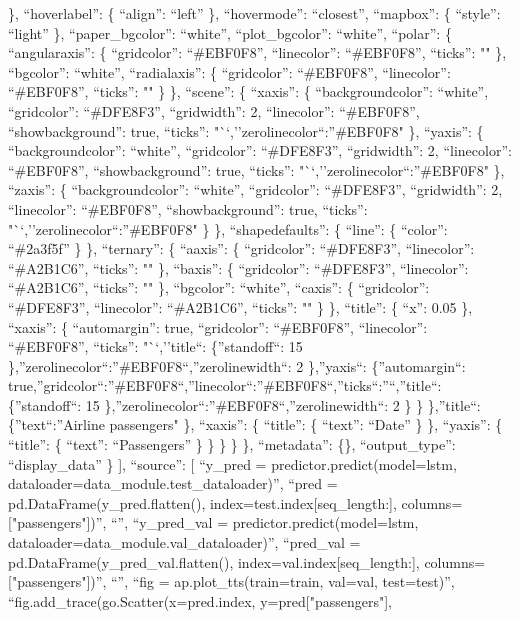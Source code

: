 \documentclass[
]{article}
\begin{document}
\}, ``hoverlabel'': \{ ``align'': ``left'' \}, ``hovermode'':
``closest'', ``mapbox'': \{ ``style'': ``light'' \}, ``paper\_bgcolor'':
``white'', ``plot\_bgcolor'': ``white'', ``polar'': \{ ``angularaxis'':
\{ ``gridcolor'': ``\#EBF0F8'', ``linecolor'': ``\#EBF0F8'', ``ticks'':
"" \}, ``bgcolor'': ``white'', ``radialaxis'': \{ ``gridcolor'':
``\#EBF0F8'', ``linecolor'': ``\#EBF0F8'', ``ticks'': "" \} \},
``scene'': \{ ``xaxis'': \{ ``backgroundcolor'': ``white'',
``gridcolor'': ``\#DFE8F3'', ``gridwidth'': 2, ``linecolor'':
``\#EBF0F8'', ``showbackground'': true, ``ticks'':
"``,''zerolinecolor``:''\#EBF0F8" \}, ``yaxis'': \{ ``backgroundcolor'':
``white'', ``gridcolor'': ``\#DFE8F3'', ``gridwidth'': 2, ``linecolor'':
``\#EBF0F8'', ``showbackground'': true, ``ticks'':
"``,''zerolinecolor``:''\#EBF0F8" \}, ``zaxis'': \{ ``backgroundcolor'':
``white'', ``gridcolor'': ``\#DFE8F3'', ``gridwidth'': 2, ``linecolor'':
``\#EBF0F8'', ``showbackground'': true, ``ticks'':
"``,''zerolinecolor``:''\#EBF0F8" \} \}, ``shapedefaults'': \{ ``line'':
\{ ``color'': ``\#2a3f5f'' \} \}, ``ternary'': \{ ``aaxis'': \{
``gridcolor'': ``\#DFE8F3'', ``linecolor'': ``\#A2B1C6'', ``ticks'': ""
\}, ``baxis'': \{ ``gridcolor'': ``\#DFE8F3'', ``linecolor'':
``\#A2B1C6'', ``ticks'': "" \}, ``bgcolor'': ``white'', ``caxis'': \{
``gridcolor'': ``\#DFE8F3'', ``linecolor'': ``\#A2B1C6'', ``ticks'': ""
\} \}, ``title'': \{ ``x'': 0.05 \}, ``xaxis'': \{ ``automargin'': true,
``gridcolor'': ``\#EBF0F8'', ``linecolor'': ``\#EBF0F8'', ``ticks'':
"``,''title``: \{''standoff``: 15
\},''zerolinecolor``:''\#EBF0F8``,''zerolinewidth``: 2 \},''yaxis``:
\{''automargin``:
true,''gridcolor``:''\#EBF0F8``,''linecolor``:''\#EBF0F8``,''ticks``:''``,''title``:
\{''standoff``: 15 \},''zerolinecolor``:''\#EBF0F8``,''zerolinewidth``:
2 \} \} \},''title``: \{''text``:''Airline passengers" \}, ``xaxis'': \{
``title'': \{ ``text'': ``Date'' \} \}, ``yaxis'': \{ ``title'': \{
``text'': ``Passengers'' \} \} \} \} \}, ``metadata'': \{\},
``output\_type'': ``display\_data'' \} {]}, ``source'': {[} ``y\_pred =
predictor.predict(model=lstm,
dataloader=data\_module.test\_dataloader)\n'', ``pred =
pd.DataFrame(y\_pred.flatten(), index=test.index{[}seq\_length:{]},
columns={[}"passengers"{]})\n'', ``\n'', ``y\_pred\_val =
predictor.predict(model=lstm,
dataloader=data\_module.val\_dataloader)\n'', ``pred\_val =
pd.DataFrame(y\_pred\_val.flatten(), index=val.index{[}seq\_length:{]},
columns={[}"passengers"{]})\n'', ``\n'', ``fig =
ap.plot\_tts(train=train, val=val, test=test)\n'',
``fig.add\_trace(go.Scatter(x=pred.index, y=pred{[}"passengers"{]},
\end{document}
